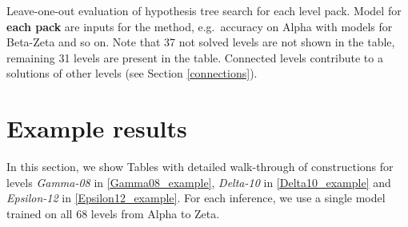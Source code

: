 \begin{table}[ht]
    
    \caption{Leave-one-out evaluation of hypothesis tree search for each level pack. Model for \textbf{each pack} are inputs for the method, e.g.~accuracy on Alpha with models for Beta-Zeta and so on. Note that 37 not solved levels are not shown in the table, remaining 31 levels are present in the table. Connected levels contribute to a solutions of other levels (see Section \ref{connections}).}
    \label{leave_one_out_packs}
\end{table}


\section{Example results}
\label{example_of_level}
In this section, we show Tables with detailed walk-through of constructions for levels \textit{Gamma-08} in \ref{Gamma08_example}, \textit{Delta-10} in \ref{Delta10_example} and \textit{Epsilon-12} in \ref{Epsilon12_example}. For each inference, we use a single model trained on all 68 levels from Alpha to Zeta.
